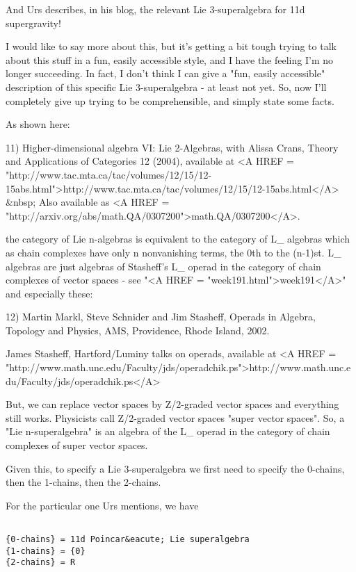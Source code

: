 And Urs describes, in his blog, the relevant Lie 3-superalgebra
for 11d supergravity!

I would like to say more about this, but it's getting a bit 
tough trying to talk about this stuff in a fun, easily accessible 
style, and I have the feeling I'm no longer succeeding.  In fact,
I don't think I can give a "fun, easily accessible" description 
of this specific Lie 3-superalgebra - at least not yet.  So, 
now I'll completely give up trying to be comprehensible, and simply 
state some facts.

As shown here:

11) Higher-dimensional algebra VI: Lie 2-Algebras, with Alissa
Crans, Theory and Applications of Categories 12 (2004),
available at <A HREF = "http://www.tac.mta.ca/tac/volumes/12/15/12-15abs.html">http://www.tac.mta.ca/tac/volumes/12/15/12-15abs.html</A> &nbsp;
Also available as <A HREF = "http://arxiv.org/abs/math.QA/0307200">math.QA/0307200</A>.

the category of Lie n-algebras is equivalent to the category
of L_{\infty } algebras which as chain complexes have only n
nonvanishing terms, the 0th to the (n-1)st.  L_{\infty } algebras
are just algebras of Stasheff's L_{\infty } operad in the category
of chain complexes of vector spaces - see "<A HREF = "week191.html">week191</A>"
and especially these:

12) Martin Markl, Steve Schnider and Jim Stasheff, Operads in Algebra,
Topology and Physics, AMS, Providence, Rhode Island, 2002.

James Stasheff, Hartford/Luminy talks on operads, available at 
<A HREF = "http://www.math.unc.edu/Faculty/jds/operadchik.ps">http://www.math.unc.edu/Faculty/jds/operadchik.ps</A>

But, we can replace vector spaces by Z/2-graded vector spaces and
everything still works.  Physicists call Z/2-graded vector spaces
"super vector spaces".  So, a "Lie n-superalgebra"
is an algebra of the L_{\infty } operad in the category of
chain complexes of super vector spaces.

Given this, to specify a Lie 3-superalgebra we first need to
specify the 0-chains, then the 1-chains, then the 2-chains.  

For the particular one Urs mentions, we have


\begin{verbatim}

{0-chains} = 11d Poincar&eacute; Lie superalgebra
{1-chains} = {0}
{2-chains} = R
\end{verbatim}
    

